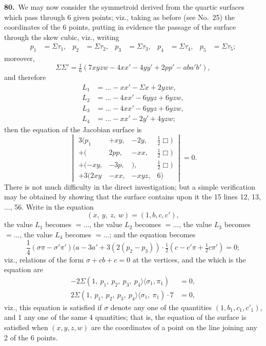 \documentclass[11pt,a4paper]{article}
\newcommand{\bw}{\mathrel{\rangle\!\langle}}
\begin{document}
\textbf{80.}\ We may now consider the symmetroid derived from the quartic surfaces which pass through 6 given points; viz., taking as before (see No.\ 25) the coordinates of the 6 points, putting in evidence the passage of the surface through the skew cubic, viz., writing
\begin{align*}
p_1 &= \Sigma\tau_1, & p_2 &= \Sigma\tau_2, & p_3 &= \Sigma\tau_3, & p_4 &= \Sigma\tau_4, & p_5 &= \Sigma\tau_5;
\end{align*}
moreover,
\[
\Sigma\Sigma' = \tfrac{1}{6}(7xyzw - 4xx' - 4yy' + 2pp' - aba'b'),
\]
and therefore
\begin{align*}
L_1 &= \ldots - xx' - \Sigma x + 2yzw,\\
L_2 &= \ldots - 4xx' - 6yyz + 6yzw,\\
L_3 &= \ldots - 4xx' - 6yyz + 6yzw,\\
L_4 &= \ldots - xx' - 2y' + 4yzw;
\end{align*}
then the equation of the Jacobian surface is
\[
\begin{vmatrix}
3(p_1 & + xy, & -2y, & \tfrac{1}{2}\Box)\\
+ ( & 2pp, & -xx, & \tfrac{1}{2}\Box)\\
+ (-xy, & -3p, & ), & \tfrac{1}{2}\Box)\\
+ 3(2xy & -xx, & -xyz, & 6) \end{vmatrix} = 0.
\]
There is not much difficulty in the direct investigation; but a simple verification may be obtained by showing that the surface contains upon it the 15 lines 12, 13, $\ldots$, 56. Write in the equation
\[
(x,\ y,\ z,\ w) = (1, b, c, c'),
\]
the value $L_1$ becomes $= \ldots$, the value $L_2$ becomes $= \ldots$, the value $L_3$ becomes $= \ldots$, the value $L_4$ becomes $= \ldots$; and the equation becomes
\[
\frac{1}{4}(\sigma \pi - \sigma' \pi') (a - 3a' + 3(2(p_2 - p_3)) \cdot \tfrac{1}{2}(c - c'\pi + \tfrac{1}{2}c\pi') = 0;
\]
viz., relations of the form $\sigma + cb + c = 0$ at the vertices, and the which is the equation are
\begin{align*}
-2\Sigma(1,\ p_1,\ p_2,\ p_3,\ p_4 \bw\sigma_1, \pi_1) &= 0,\\
2\Sigma(1,\ p_1,\ p_2,\ p_3,\ p_4 \bw\sigma_1,\ \pi_1)\cdot 7 &= 0,
\end{align*}
viz., this equation is satisfied if $\sigma$ denote any one of the quantities $(1, b_1, c_1, c'_1)$, and 1 any one of the same 4 quantities; that is, the equation of the surface is satisfied when $(x, y, z, w)$ are the coordinates of a point on the line joining any 2 of the 6 points.
\end{document}
